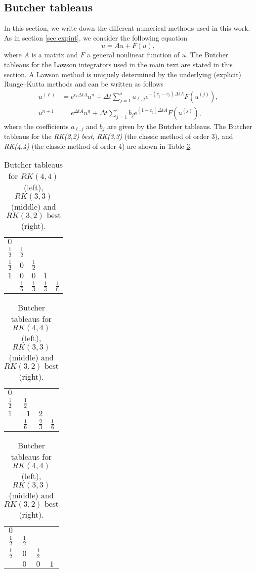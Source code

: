 \begin{subappendices}
\section{Butcher tableaus}
\label{butcher}
In this section, we write down the different numerical methods used in this work. As in section \ref{sec:expint},
we consider the following equation
$$
\dot{u} = A u + F(u),
$$
where $A$ is a matrix and $F$ a general nonlinear function of $u$.
The Butcher tableaus for the Lawson integrators used in the main text are stated in this section.
A Lawson method is uniquely determined by the underlying (explicit) Runge--Kutta methods and can be written as follows
$$
\begin{aligned}
        u^{(\ell)} &= e^{c_\ell \Delta t A}u^n + \Delta t\sum_{j=1}^s a_{\ell, j} e^{-(c_j-c_\ell)\Delta t A} F(u^{(j)}),  \\
    u^{n+1} &= e^{\Delta t A}u^n + \Delta t\sum_{j=1}^s    b_j e^{(1-c_j)\Delta t A} F(u^{(j)}),
  \end{aligned}
$$
where the coefficients  $a_{\ell, j}$ and $b_j$ are given by the Butcher tableaus.
The Butcher tableaus for the \textit{RK(2,2) best}, \textit{RK(3,3)} (the classic method of order 3),
and \textit{RK(4,4)} (the classic method of order 4) are shown in Table \ref{rks}.

\begin{table}[h]
\centering
\begin{tabular}
{c|cccc}
$0$\\
$\frac{1}{2}$ & $\frac{1}{2}$\\
$\frac{1}{2}$ &$0$ &$\frac{1}{2}$ \\
$1$& $0$& $0$& $1$\\
\hline
& $\frac{1}{6}$ &$\frac{1}{3}$ &$\frac{1}{3}$ &$\frac{1}{6} $
\end{tabular}
\hspace{1cm}
\begin{tabular}
{c|ccc}
$0$\\
$\frac{1}{2}$ & $\frac{1}{2}$\\
$1 $ &$-1$ &$2$ \\
\hline
& $\frac{1}{6}$ &$\frac{2}{3}$ &$\frac{1}{6}$
\end{tabular}
\hspace{1cm}
\begin{tabular}
{c|ccc}
$0$\\
$\frac{1}{2}$ & $\frac{1}{2}$\\
$\frac{1}{2}$              &$0$ &$\frac{1}{2}$ \\
\hline
& $0$ &$0$ &$1$
\end{tabular}
    \caption{Butcher tableaus for $RK(4,4)$ (left), $RK(3,3)$ (middle) and $RK(3,2)\text{ best}$ (right).}
\label{rks}
\end{table}



\end{subappendices}
